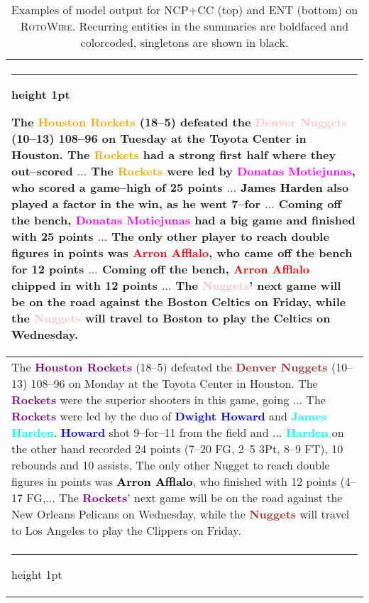 \documentclass[11pt,a4paper]{article}
\makeatletter
\newcommand{\thickhline}{\noalign {\ifnum 0=`}\fi \hrule height 1pt
    \futurelet \reserved@a \@xhline
}
\makeatother
\begin{document}
\begin{table}[t]
\footnotesize
\centering
\begin{tabular}{@{~}p{}@{~}} \thickhline
The \textcolor{orange}{\textbf{Houston Rockets}} (18--5) defeated the \textcolor{pink}{\textbf{Denver Nuggets}} 
  (10--13) 108--96 on Tuesday at the Toyota Center in Houston. The 
  \textcolor{orange}{\textbf{Rockets}} had a strong first half where they out--scored $\dots$
The \textcolor{orange}{\textbf{Rockets}} 
  were led by \textcolor{magenta}{\textbf{Donatas Motiejunas}}, who scored a game--high of 25 points $\dots$
\textcolor{black}{\textbf{James Harden}} also played a factor in the win,   as he went 7--for $\dots$
Coming off the bench, \textcolor{magenta}{\textbf{Donatas Motiejunas}} had a big game and finished with 25 points $\dots$
The only other player to reach double figures in points was \textcolor{red}{\textbf{Arron Afflalo}}, who came off the bench for 12 points $\dots$
Coming off the bench, \textcolor{red}{\textbf{Arron Afflalo}} chipped in with 12 points $\dots$
The \textcolor{pink}{\textbf{Nuggets}}' next game will be on the road against the Boston Celtics on Friday, 
  while the \textcolor{pink}{\textbf{Nuggets}} will travel to Boston to play the Celtics on Wednesday. 
  \\ \hline 
  The \textcolor{purple}{\textbf{Houston Rockets}} (18--5) defeated the \textcolor{brown}{\textbf{Denver Nuggets}}
  (10--13) 108--96 on Monday at the Toyota Center in Houston. The 
  \textcolor{purple}{\textbf{Rockets}} were the superior shooters in this game, going $\dots$
The \textcolor{purple}{\textbf{Rockets}} were led by the duo of \textcolor{blue}{\textbf{Dwight Howard}} and \textcolor{cyan}{\textbf{James Harden}}. \textcolor{blue}{\textbf{Howard}} shot 9--for--11 from the field and $\dots$
\textcolor{cyan}{\textbf{Harden}} on the other hand recorded 24 points   (7--20 FG, 2--5 3Pt, 8--9 FT), 10 rebounds and 10 assists, 
The only other Nugget to reach double figures in 
  points was \textcolor{black}{\textbf{Arron Afflalo}}, who finished with 12 points (4--17 FG,$\dots$
The  
  \textcolor{purple}{\textbf{Rockets}}' next game will be on the road against the New Orleans 
  Pelicans on Wednesday, while the \textcolor{brown}{\textbf{Nuggets}} will travel to Los Angeles 
  to play the Clippers on Friday.
  \\ 
  \thickhline
\end{tabular}
\caption{\label{tab:output1} Examples of model output for NCP+CC (top)
  and ENT (bottom) on \textsc{RotoWire}. 
  Recurring entities in the summaries are boldfaced and colorcoded,
  singletons are shown in black.}
\end{table}
\end{document}
